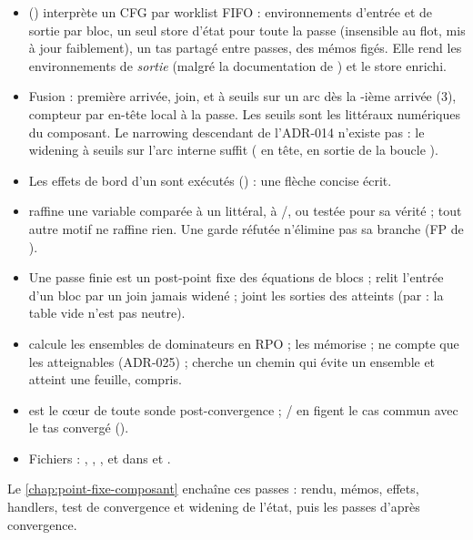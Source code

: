 \begin{resume}
\begin{itemize}
  \item {} () interprète un
    CFG par worklist FIFO : environnements d'entrée et de sortie par bloc,
    un seul store d'état pour toute la passe (insensible au flot, mis à jour
    faiblement), un tas partagé entre passes, des mémos figés. Elle rend les
    environnements de \emph{sortie} (malgré la documentation de
    ) et le store enrichi.
  \item Fusion : première arrivée, join, et  à seuils sur un
    arc  dès la -ième arrivée (3), compteur
    par en-tête local à la passe. Les seuils sont les littéraux numériques du
    composant. Le narrowing descendant de l'ADR-014 n'existe pas : le
    widening à seuils sur l'arc interne suffit (\code{[0,5]} en tête,
    \code{[5,5]} en sortie de la boucle ).
  \item Les effets de bord d'un  sont exécutés
    () : une flèche concise écrit.
  \item {} raffine une variable comparée à un
    littéral, à /, ou testée pour sa vérité ;
    tout autre motif ne raffine rien. Une garde réfutée n'élimine pas sa
    branche (FP de ).
  \item Une passe finie est un post-point fixe des équations de blocs ;
     relit l'entrée d'un bloc par un join jamais widené ;
     joint les sorties des  atteints (par
     : la table vide n'est pas neutre).
  \item {} calcule les ensembles de dominateurs en
    RPO ;  les mémorise ;  ne compte
    que les  atteignables (ADR-025) ; 
    cherche un chemin qui évite un ensemble et atteint une feuille, 
    compris.
  \item {} est le cœur de toute sonde post-convergence ;
    / en figent le cas commun avec le tas
    convergé ().
  \item Fichiers : ,
    , , et dans
      et
    .
\end{itemize}
Le \cref{chap:point-fixe-composant} enchaîne ces passes : rendu, mémos, effets,
handlers, test de convergence et widening de l'état, puis les passes d'après
convergence.
\end{resume}

